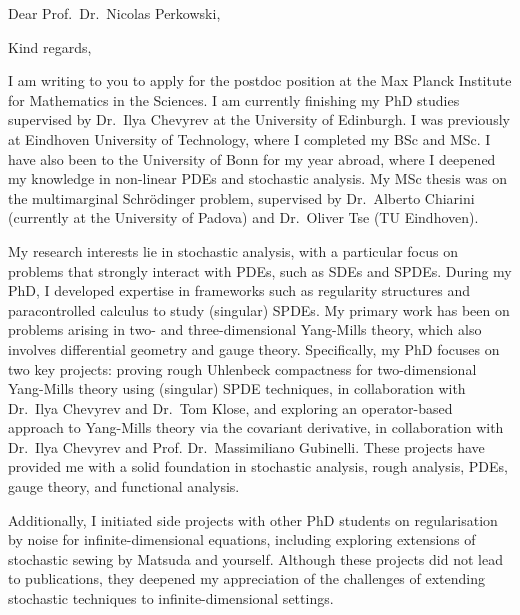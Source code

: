 \documentclass[11pt,a4paper]{moderncv}
\begin{document}
\date{\today}
\opening{Dear Prof.\ Dr.\  Nicolas Perkowski,}
\closing{Kind regards,\vspace{-2em}}

\makelettertitle

I am writing to you to apply for the postdoc position at the Max Planck Institute for Mathematics in the Sciences. I am currently finishing my PhD studies supervised by Dr.\ Ilya Chevyrev at the University of Edinburgh. I was previously at Eindhoven University of Technology, where I completed my BSc and MSc. I have also been to the University of Bonn for my year abroad, where I deepened my knowledge in non-linear PDEs and stochastic analysis. My MSc thesis was on the multimarginal Schrödinger problem, supervised by Dr.\ Alberto Chiarini (currently at the University of Padova) and Dr.\ Oliver Tse (TU Eindhoven).

My research interests lie in stochastic analysis, with a particular focus on problems that strongly interact with PDEs, such as SDEs and SPDEs. During my PhD, I developed expertise in frameworks such as regularity structures and paracontrolled calculus to study (singular) SPDEs. My primary work has been on problems arising in two- and three-dimensional Yang-Mills theory, which also involves differential geometry and gauge theory. Specifically, my PhD focuses on two key projects: proving rough Uhlenbeck compactness for two-dimensional Yang-Mills theory using (singular) SPDE techniques, in collaboration with Dr.\ Ilya Chevyrev and Dr.\ Tom Klose, and exploring an operator-based approach to Yang-Mills theory via the covariant derivative, in collaboration with Dr.\ Ilya Chevyrev and Prof. Dr.\ Massimiliano Gubinelli. These projects have provided me with a solid foundation in stochastic analysis, rough analysis, PDEs, gauge theory, and functional analysis.

Additionally, I initiated side projects with other PhD students on regularisation by noise for infinite-dimensional equations, including exploring extensions of stochastic sewing by Matsuda and yourself. Although these projects did not lead to publications, they deepened my appreciation of the challenges of extending stochastic techniques to infinite-dimensional settings.
\end{document}
